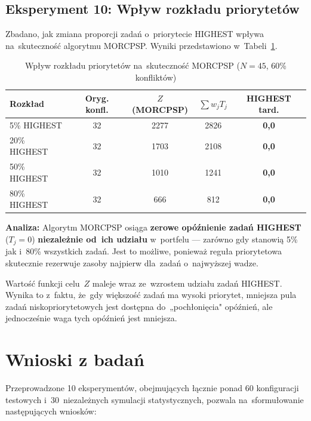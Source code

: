 \subsection{Eksperyment 10: Wpływ rozkładu priorytetów}

Zbadano, jak zmiana proporcji zadań o~priorytecie HIGHEST wpływa na~skuteczność algorytmu MORCPSP. Wyniki przedstawiono w~Tabeli~\ref{tab:exp10_dist}.

\begin{table}[H]
\centering
\caption{Wpływ rozkładu priorytetów na~skuteczność MORCPSP ($N=45$, 60\% konfliktów)}
\label{tab:exp10_dist}
\begin{tabular}{|l|c|c|c|c|}
\hline
\textbf{Rozkład} & \textbf{Oryg. konfl.} & $Z$\textbf{(MORCPSP)} & $\sum w_j T_j$ & \textbf{HIGHEST tard.} \\ \hline
5\% HIGHEST & 32 & 2277 & 2826 & \textbf{0{,}0} \\ \hline
20\% HIGHEST & 32 & 1703 & 2108 & \textbf{0{,}0} \\ \hline
50\% HIGHEST & 32 & 1010 & 1241 & \textbf{0{,}0} \\ \hline
80\% HIGHEST & 32 & 666 & 812 & \textbf{0{,}0} \\ \hline
\end{tabular}
\end{table}

\textbf{Analiza:} Algorytm MORCPSP osiąga \textbf{zerowe opóźnienie zadań HIGHEST} ($T_j = 0$) \textbf{niezależnie od~ich udziału} w~portfelu --- zarówno gdy stanowią 5\% jak i~80\% wszystkich zadań. Jest to możliwe, ponieważ reguła priorytetowa skutecznie rezerwuje zasoby najpierw dla~zadań o~najwyższej wadze.

Wartość funkcji celu~$Z$ maleje wraz ze~wzrostem udziału zadań HIGHEST. Wynika to z~faktu, że~gdy większość zadań ma wysoki priorytet, mniejsza pula zadań niskopriorytetowych jest dostępna do~„pochłonięcia" opóźnień, ale jednocześnie waga tych opóźnień jest mniejsza.

\section{Wnioski z badań}

Przeprowadzone 10 eksperymentów, obejmujących łącznie ponad 60 konfiguracji testowych i~30~niezależnych symulacji statystycznych, pozwala na~sformułowanie następujących wniosków:


